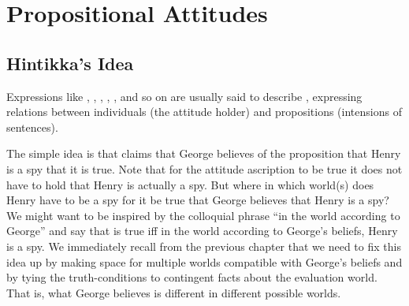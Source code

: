 \chapter{Propositional Attitudes}\label{cha:propositional_attitudes} %


\minitoc

\section{Hintikka's Idea} \label{sec:hintikkas-idea}

Expressions like , , , , , and so on are usually said to describe , expressing relations between individuals (the attitude holder) and propositions (intensions of sentences). 

The simple idea is that  claims that George believes of the proposition that Henry is a spy that it is true. Note that for the attitude ascription to be true it does not have to hold that Henry is actually a spy. But where \dash in which world(s) \dash does Henry have to be a spy for it be true that George believes that Henry is a spy? We might want to be inspired by the colloquial phrase ``in the world according to George'' and say that  is true iff in the world according to George's beliefs, Henry is a spy. We immediately recall from the previous chapter that we need to fix this idea up by making space for multiple worlds compatible with George's beliefs and by tying the truth-conditions to contingent facts about the evaluation world. That is, what George believes is different in different possible worlds.

